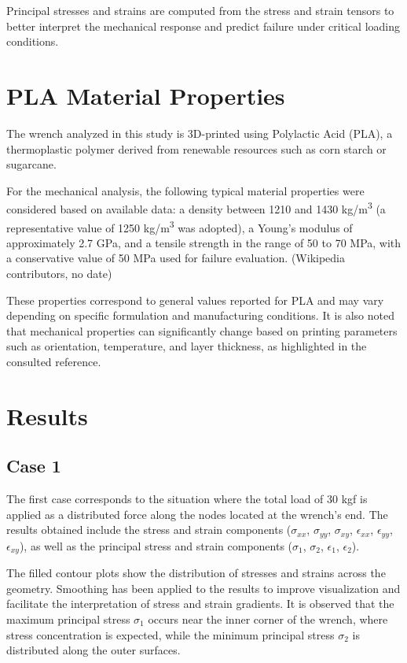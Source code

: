 \documentclass[12pt]{article}
\begin{document}
Principal stresses and strains are computed from the stress and strain tensors to better interpret the mechanical response and predict failure under critical loading conditions.

\section{PLA Material Properties}
The wrench analyzed in this study is 3D-printed using Polylactic Acid (PLA), a thermoplastic polymer derived from renewable resources such as corn starch or sugarcane.

For the mechanical analysis, the following typical material properties were considered based on available data:  
a density between 1210 and 1430 kg/m\textsuperscript{3} (a representative value of 1250 kg/m\textsuperscript{3} was adopted),  
a Young's modulus of approximately 2.7 GPa,  
and a tensile strength in the range of 50 to 70 MPa, with a conservative value of 50 MPa used for failure evaluation. (Wikipedia contributors, no date)

These properties correspond to general values reported for PLA and may vary depending on specific formulation and manufacturing conditions.  
It is also noted that mechanical properties can significantly change based on printing parameters such as orientation, temperature, and layer thickness, as highlighted in the consulted reference.


\newpage
\section{Results}

\subsection{Case 1}

The first case corresponds to the situation where the total load of 30 kgf is applied as a distributed force along the nodes located at the wrench's end.  
The results obtained include the stress and strain components ($\sigma_{xx}$, $\sigma_{yy}$, $\sigma_{xy}$, $\epsilon_{xx}$, $\epsilon_{yy}$, $\epsilon_{xy}$), as well as the principal stress and strain components ($\sigma_1$, $\sigma_2$, $\epsilon_1$, $\epsilon_2$).

The filled contour plots show the distribution of stresses and strains across the geometry. Smoothing has been applied to the results to improve visualization and facilitate the interpretation of stress and strain gradients.  
It is observed that the maximum principal stress $\sigma_1$ occurs near the inner corner of the wrench, where stress concentration is expected, while the minimum principal stress $\sigma_2$ is distributed along the outer surfaces.
\end{document}
